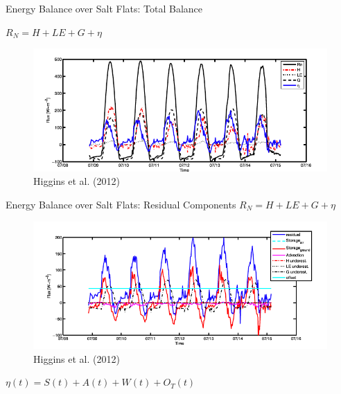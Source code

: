 \begin{frame}{Energy Balance over Salt Flats: Total Balance}

\centering $R_N = H + LE + G + \eta$
\begin{figure}
	\includegraphics[width=\textwidth]{fig2.png}
	\newline \centering \tiny Higgins et al. (2012)
\end{figure}
\end{frame}

\begin{frame}{Energy Balance over Salt Flats: Residual Components}
\centering $R_N = H + LE + G + \boxed{\eta}$
\begin{figure}
	\includegraphics[width=\textwidth]{fig3.png}
	\centering \newline \tiny Higgins et al. (2012)
\end{figure}
$\eta(t) = S(t) + A(t) + W(t) + O_T(t)$
\end{frame}


